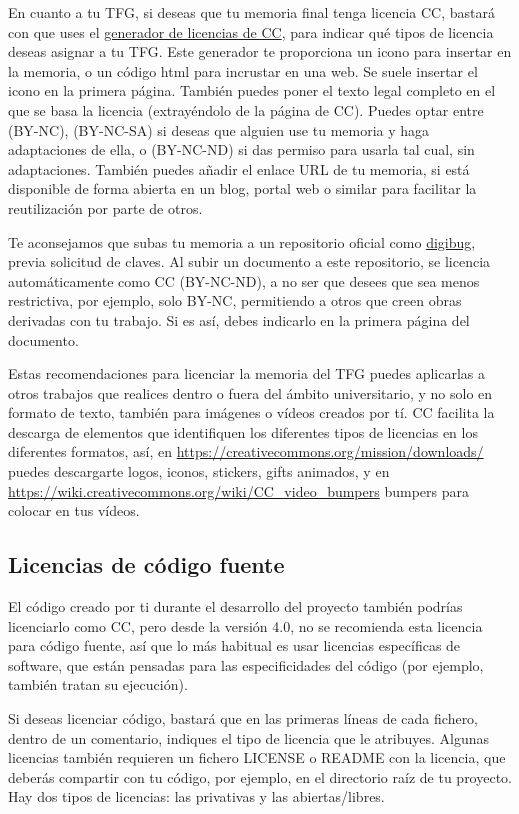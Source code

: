 \begin{naranja}
 
En cuanto a tu TFG, si deseas que tu memoria final tenga licencia CC, bastará con que uses el \href{https://chooser-beta.creativecommons.org/}{generador de licencias de CC}, para indicar qué tipos de licencia deseas asignar a tu TFG. Este generador te proporciona un icono para insertar en la memoria, o un código html para incrustar en una web. Se suele insertar el icono en la primera página. También puedes poner el texto legal completo en el que se basa la licencia (extrayéndolo de la página de CC). Puedes optar entre (BY-NC), (BY-NC-SA) si deseas que alguien use tu memoria y haga adaptaciones de ella, o (BY-NC-ND) si das permiso para usarla tal cual, sin adaptaciones. También puedes añadir el enlace URL de tu memoria, si está disponible de forma abierta en un blog, portal web o similar para facilitar la reutilización por parte de otros. 

Te aconsejamos que subas tu memoria a un repositorio oficial como \href{https://digibug.ugr.es/password-login}{digibug}, previa solicitud de claves. Al subir un documento a este repositorio, se licencia automáticamente como CC (BY-NC-ND), a no ser que desees que sea menos restrictiva, por ejemplo, solo BY-NC, permitiendo a otros que creen obras derivadas con tu trabajo. Si es así, debes indicarlo en la primera página del documento. 

Estas recomendaciones para licenciar la memoria del TFG puedes aplicarlas a otros trabajos que realices dentro o fuera del ámbito universitario, y no solo en formato de texto, también para imágenes o vídeos creados por tí. CC facilita la descarga de elementos que identifiquen los diferentes tipos de licencias en los diferentes formatos, así, en \url{https://creativecommons.org/mission/downloads/} puedes descargarte logos, iconos, stickers, gifts animados, y en \url{https://wiki.creativecommons.org/wiki/CC_video_bumpers} bumpers para colocar en tus vídeos.

\subsection{Licencias de código fuente}

El código creado por ti durante el desarrollo del proyecto también podrías licenciarlo como CC, pero desde la versión 4.0, no se recomienda esta licencia para código fuente, así que lo más habitual es usar licencias específicas de software, que están pensadas para las especificidades del código (por ejemplo, también tratan su  ejecución). 

Si deseas licenciar código, bastará que en las primeras líneas de cada fichero, dentro de un comentario, indiques el tipo de licencia que le atribuyes. Algunas licencias también requieren un fichero LICENSE o README con la licencia, que deberás compartir con tu código, por ejemplo, en el directorio raíz de tu proyecto. Hay dos tipos de licencias: las privativas y las abiertas/libres.


\end{naranja}
